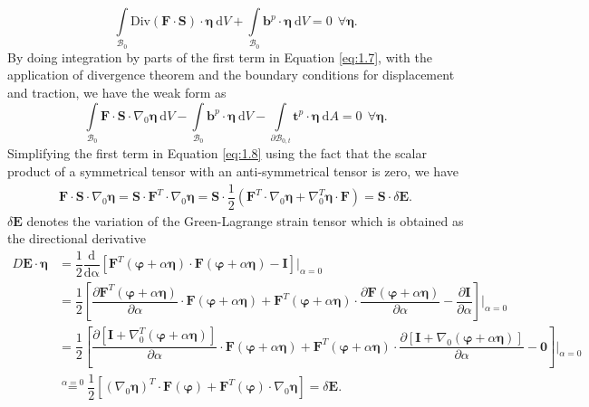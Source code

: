 \begin{equation}
\int\limits_{\mathcal{B}_0} \text{Div}(\mathbf{F} \cdot \mathbf{S}) \cdot \bm{\eta} \ \mathrm{d}V + \int\limits_{\mathcal{B}_0} \mathbf{b}^p \cdot \bm{\eta} \ \mathrm{d}V = 0 \ \ \forall \bm{\eta}.
\label{eq:1.7}
\end{equation}
By doing integration by parts of the first term in Equation \eqref{eq:1.7}, with the application of divergence theorem and the boundary conditions for displacement and traction, we have the weak form as 
\begin{equation}
\int\limits_{\mathcal{B}_0} \mathbf{F} \cdot \mathbf{S} \cdot \nabla_0 \bm{\eta} \ \mathrm{d}V - \int\limits_{\mathcal{B}_0} \mathbf{b}^p \cdot \bm{\eta} \ \mathrm{d}V - \int\limits_{\mathcal{\partial B}_{0,t}} \mathbf{t}^p \cdot \bm{\eta} \ \mathrm{d}A = 0 \ \ \forall \bm{\eta}.
\label{eq:1.8}
\end{equation}
Simplifying the first term in Equation \eqref{eq:1.8} using the fact that the scalar product of a symmetrical tensor with an anti-symmetrical tensor is zero, we have
\begin{align}
\mathbf{F} \cdot \mathbf{S} \cdot \nabla_0 \bm{\eta} = \mathbf{S} \cdot \mathbf{F}^T \cdot \nabla_0 \bm{\eta} = \mathbf{S} \cdot \dfrac{1}{2} (\mathbf{F}^T \cdot \nabla_0 \bm{\eta} + \nabla_0^T \bm{\eta} \cdot \mathbf{F}) = \mathbf{S} \cdot \delta \mathbf{E}.
\label{eq:1.9}
\end{align}
$\delta \mathbf{E}$ denotes the variation of the Green-Lagrange strain tensor which is obtained as the directional derivative
\begin{align}
D\mathbf{E} \cdot \bm{\eta} &= \dfrac{1}{2} \dfrac{\mathrm{d}}{\mathrm{d\alpha}} \left[ \mathbf{F}^T (\bm{\varphi} + \alpha \bm{\eta}) \cdot \mathbf{F}(\bm{\varphi} + \alpha \bm{\eta}) - \mathbf{I} \right] \Big|_{\alpha = 0} \nonumber \\
&= \dfrac{1}{2} \left[ \dfrac{\partial \mathbf{F}^T (\bm{\varphi} + \alpha \bm{\eta})}{\partial \alpha} \cdot \mathbf{F}(\bm{\varphi} + \alpha \bm{\eta}) + \mathbf{F}^T (\bm{\varphi} + \alpha \bm{\eta}) \cdot \dfrac{\partial \mathbf{F}(\bm{\varphi} + \alpha \bm{\eta})}{\partial \alpha} - \dfrac{\partial \mathbf{I}}{\partial \alpha} \right] \Bigg|_{\alpha = 0} \nonumber \\
&= \dfrac{1}{2} \left[ \dfrac{\partial \left[ \mathbf{I} + \nabla_0^T (\bm{\varphi} + \alpha \bm{\eta}) \right]}{\partial \alpha} \cdot \mathbf{F}(\bm{\varphi} + \alpha \bm{\eta}) + \mathbf{F}^T (\bm{\varphi} + \alpha \bm{\eta}) \cdot \dfrac{\partial \left[ \mathbf{I} + \nabla_0 (\bm{\varphi} + \alpha \bm{\eta}) \right]}{\partial \alpha} - \mathbf{0} \right] \Bigg|_{\alpha = 0} \nonumber \\
&\stackrel{\alpha = 0}{=} \dfrac{1}{2} \left[ (\nabla_0 \bm{\eta})^T \cdot \mathbf{F} (\bm{\varphi}) + \mathbf{F}^T (\bm{\varphi}) \cdot \nabla_0 \bm{\eta} \right] = \delta \mathbf{E}.
\label{eq:1.10}
\end{align}
